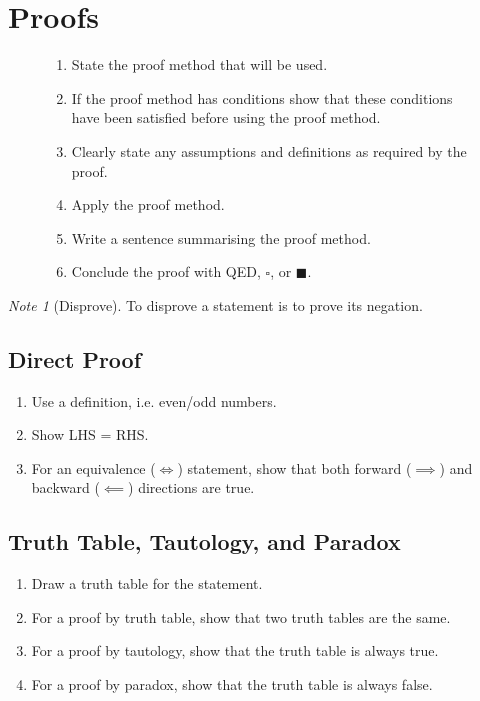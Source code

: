 \documentclass{article}
\theoremstyle{plain}
\numberwithin{theorem}{subsection}
\theoremstyle{definition}
\numberwithin{definition}{subsection}
\theoremstyle{remark}
\newtheorem{note}{Note}[section]
\numberwithin{note}{subsection}
\begin{document}
\section{Proofs}
\begin{figure}[H]
	\begin{mdframed}[style=exampledefault,frametitle={Proof Structure}]
		\begin{enumerate}[leftmargin=3.5em, itemsep=0.2em, topsep=0.35em]
			\item State the proof method that will be used.
			\item If the proof method has conditions show that these conditions have been satisfied before using the proof method.
			\item Clearly state any assumptions and definitions as required by the proof.
			\item Apply the proof method.
			\item Write a sentence summarising the proof method.
			\item Conclude the proof with QED, $\square$, or $\blacksquare$.
		\end{enumerate}
	\end{mdframed}
\end{figure}
%
\begin{note}[Disprove]
    To disprove a statement is to prove its negation.
\end{note}
%
\subsection{Direct Proof}
\begin{enumerate}
    \item Use a definition, i.e. even/odd numbers.
    \item Show LHS = RHS.
    \item For an equivalence ($\iff$) statement, show that both forward ($\implies$) and backward ($\impliedby$) directions are true.
\end{enumerate}
%
\subsection{Truth Table, Tautology, and Paradox}
\begin{enumerate}
    \item Draw a truth table for the statement.
    \item For a proof by truth table, show that two truth tables are the same.
    \item For a proof by tautology, show that the truth table is always true.
    \item For a proof by paradox, show that the truth table is always false.
\end{enumerate}
%
\end{document}
